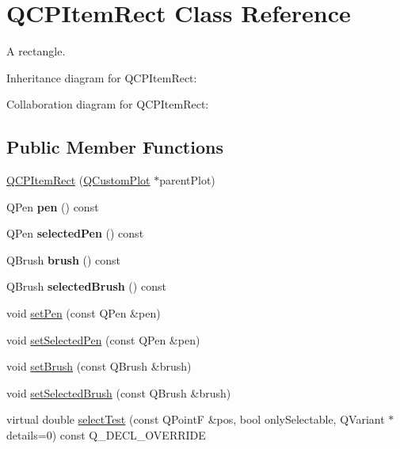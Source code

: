 \hypertarget{classQCPItemRect}{}\section{Q\+C\+P\+Item\+Rect Class Reference}
\label{classQCPItemRect}


A rectangle.  




Inheritance diagram for Q\+C\+P\+Item\+Rect\+:


Collaboration diagram for Q\+C\+P\+Item\+Rect\+:
\subsection*{Public Member Functions}
\begin{DoxyCompactItemize}
\item 
\hyperlink{classQCPItemRect_a412ad1579f7a1fba453d0fa28c496cbc}{Q\+C\+P\+Item\+Rect} (\hyperlink{classQCustomPlot}{Q\+Custom\+Plot} $\ast$parent\+Plot)
\item 
\mbox{\label{classQCPItemRect_a3ee2f580a3950dc11247f405ce8b6ecf}} 
Q\+Pen {\bfseries pen} () const
\item 
\mbox{\label{classQCPItemRect_abd93cf93404ce827dfae71d9d9d08b29}} 
Q\+Pen {\bfseries selected\+Pen} () const
\item 
\mbox{\label{classQCPItemRect_a5071d7fd864428a1398152aca87b54ad}} 
Q\+Brush {\bfseries brush} () const
\item 
\mbox{\label{classQCPItemRect_a2b0a6852bc92d716c7e811c90de2c1a9}} 
Q\+Brush {\bfseries selected\+Brush} () const
\item 
void \hyperlink{classQCPItemRect_a483c0da5a17e1646cd17ddea2c124e7d}{set\+Pen} (const Q\+Pen \&pen)
\item 
void \hyperlink{classQCPItemRect_a52a1bcb2dc753a538e406a2ba3cf21ce}{set\+Selected\+Pen} (const Q\+Pen \&pen)
\item 
void \hyperlink{classQCPItemRect_abbd4e346a03513ee466afc25d9c75446}{set\+Brush} (const Q\+Brush \&brush)
\item 
void \hyperlink{classQCPItemRect_abd1792859844118dedee86223cede7af}{set\+Selected\+Brush} (const Q\+Brush \&brush)
\item 
virtual double \hyperlink{classQCPItemRect_a2e68621b75bae4da6ae0ab2cdd0dd733}{select\+Test} (const Q\+PointF \&pos, bool only\+Selectable, Q\+Variant $\ast$details=0) const Q\+\_\+\+D\+E\+C\+L\+\_\+\+O\+V\+E\+R\+R\+I\+DE
\end{DoxyCompactItemize}
